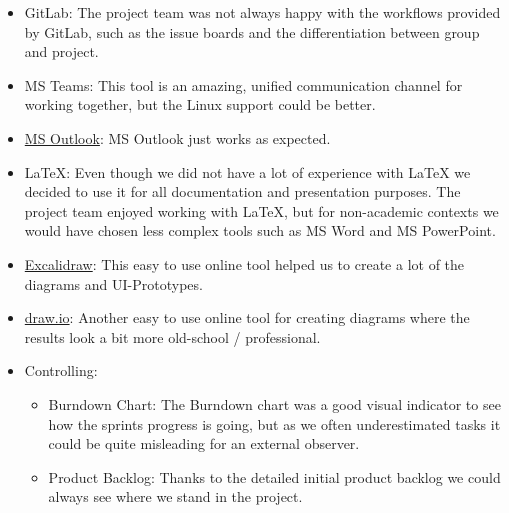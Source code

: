 \begin{itemize}
    \item GitLab: The project team was not always happy with the workflows provided by GitLab, such as the issue boards and the differentiation between group and project.
    \item MS Teams: This tool is an amazing, unified communication channel for working together, but the Linux support could be better.
    \item \href{https://www.microsoft.com/en-us/microsoft-365/outlook/email-and-calendar-software-microsoft-outlook}{MS Outlook}: MS Outlook just works as expected.
    \item LaTeX: Even though we did not have a lot of experience with LaTeX we decided to use it for all documentation and presentation purposes.
          The project team enjoyed working with LaTeX, but for non-academic contexts we would have chosen less complex tools such as MS Word and MS PowerPoint.
    \item \href{https://excalidraw.com/}{Excalidraw}: This easy to use online tool helped us to create a lot of the diagrams and UI-Prototypes.
    \item \href{https://www.drawio.com/}{draw.io}: Another easy to use online tool for creating diagrams where the results look a bit more old-school / professional.
    \item Controlling:
    \begin{itemize}
        \item Burndown Chart: The Burndown chart was a good visual indicator to see how the sprints progress is going, but as we often underestimated tasks it could be quite misleading for an external observer.
        \item Product Backlog: Thanks to the detailed initial product backlog we could always see where we stand in the project.
    \end{itemize}
\end{itemize}